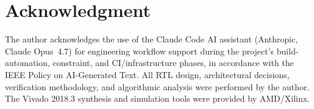 \documentclass[journal]{IEEEtran}
\begin{document}
\section*{Acknowledgment}
The author acknowledges the use of the Claude Code AI assistant
(Anthropic, Claude Opus~4.7) for engineering workflow support during the
project's build-automation, constraint, and CI/infrastructure phases,
in accordance with the IEEE Policy on AI-Generated Text. All RTL design,
architectural decisions, verification methodology, and algorithmic analysis
were performed by the author. The Vivado 2018.3 synthesis and simulation
tools were provided by AMD/Xilinx.

\end{document}
